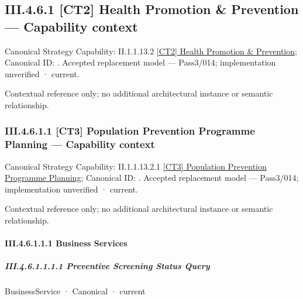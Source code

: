 \subsection*{III.4.6.1 [CT2] Health Promotion \& Prevention — Capability context}
\label{navigation:III.4.6.1}

{\small Canonical Strategy Capability: II.1.1.13.2 \hyperref[element:b0100053f6174e2b86e15c545a2fd4d0]{[CT2] Health Promotion \& Prevention}; Canonical ID: \texttt{}. Accepted replacement model — Pass3/014; implementation unverified · current.}\par
Contextual reference only; no additional architectural instance or semantic relationship.\par
\subsubsection*{III.4.6.1.1 [CT3] Population Prevention Programme Planning — Capability context}
\label{navigation:III.4.6.1.1}

{\small Canonical Strategy Capability: II.1.1.13.2.1 \hyperref[element:5e440d45f96e47a29981efa4e7153a9d]{[CT3] Population Prevention Programme Planning}; Canonical ID: \texttt{}. Accepted replacement model — Pass3/014; implementation unverified · current.}\par
Contextual reference only; no additional architectural instance or semantic relationship.\par
\paragraph*{III.4.6.1.1.1 Business Services}
\label{navigation:III.4.6.1.1.1}

\subparagraph*{III.4.6.1.1.1.1 Preventive Screening Status Query}
\label{navigation:III.4.6.1.1.1.1}

\label{element:bc679a6f23de44b79a452fb5ef10c5ee}
{\small BusinessService · Canonical · current}\par

